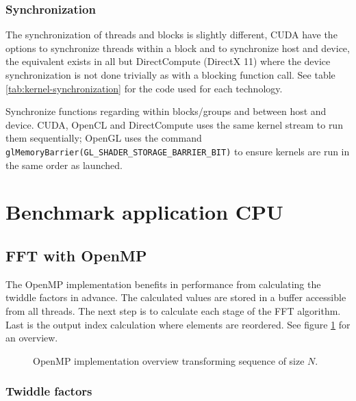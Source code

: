 \subsubsection{Synchronization}

The synchronization of threads and blocks is slightly different, CUDA have the options to synchronize threads within a block and to synchronize host and device, the equivalent exists in all but DirectCompute (DirectX 11) where the device synchronization is not done trivially as with a blocking function call. See table \ref{tab:kernel-synchronization} for the code used for each technology.

\begin{table}[H]
	\centering
	
	\caption{Synchronize functions regarding within blocks/groups and between host and device. CUDA, OpenCL and DirectCompute uses the same kernel stream to run them sequentially; OpenGL uses the command \texttt{glMemoryBarrier(GL\_SHADER\_STORAGE\_BARRIER\_BIT)} to ensure kernels are run in the same order as launched.}
	\label{tab:kernel-synchronization}
\end{table}

\section{Benchmark application CPU}

\subsection{FFT with OpenMP}

The OpenMP implementation benefits in performance from calculating the twiddle factors in advance. The calculated values are stored in a buffer accessible from all threads. The next step is to calculate each stage of the FFT algorithm. Last is the output index calculation where elements are reordered. See figure \ref{fig:omp:overview} for an overview.

\begin{figure}
	\centering
	
	\caption{OpenMP implementation overview transforming sequence of size $N$.}
	\label{fig:omp:overview}
\end{figure}

\subsubsection{Twiddle factors}

